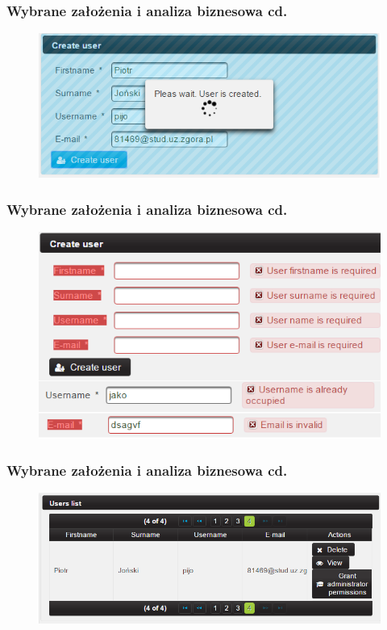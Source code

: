 \documentclass[hyperref={pdfpagelabels=false}]{beamer}
\begin{document}
\begin{frame}
	\frametitle{Wybrane założenia i analiza biznesowa cd.}
	\begin{figure}
	\centering
	\includegraphics[width=1\linewidth]{user-czekanie}
	\end{figure}
\end{frame}
\begin{frame}
	\frametitle{Wybrane założenia i analiza biznesowa cd.}
	\begin{figure}
		\centering
		\includegraphics[width=1\linewidth]{user-blad}
	\end{figure}
\end{frame}
\begin{frame}
	\frametitle{Wybrane założenia i analiza biznesowa cd.}
	\begin{figure}
		\centering
		\includegraphics[width=1\linewidth]{user-list}
	\end{figure}
\end{frame}
\end{document}
